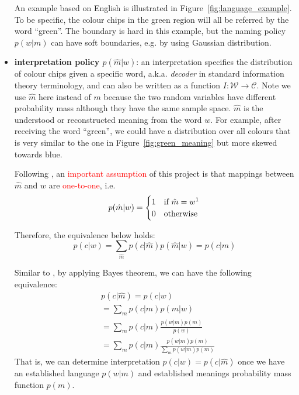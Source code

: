 \documentclass[11pt]{article}
\begin{document}
\begin{itemize}[leftmargin=*]
    An example based on English is illustrated in Figure~\ref{fig:language_example}.
    To be specific, the colour chips in the green region will all be referred by the word ``green''.
    The boundary is hard in this example, but the naming policy $p(w|m)$ can have soft boundaries, e.g. by using Gaussian distribution.
    
    \item \textbf{interpretation policy $p(\hat{m}|w)$\label{par:decoder}}: an interpretation specifies the distribution of colour chips given a specific word, a.k.a. \emph{decoder} in standard information theory terminology, and can also be written as a function $I:\mathcal{W}\rightarrow\mathcal{C}$.
    Note we use $\hat{m}$ here instead of $m$ because the two random variables have different probability mass although they have the same sample space. 
    $\hat{m}$ is the understood or reconstructed meaning from the word $w$.
    For example, after receiving the word ``green'', we could have a distribution over all colours that is very similar to the one in Figure~\ref{fig:green_meaning} but more skewed towards blue.
    
    Following \citet{zaslavsky2018efficient}, an \textcolor{red}{important assumption} of this project is that mappings between $\hat{m}$ and $w$ are \textcolor{red}{one-to-one}, i.e.
    \begin{equation}
        p(\hat{m}|w) =
        \begin{cases}
            1 & \text{if $\hat{m}=w$\footnote{Rigorously speaking, $\hat{m}$ can't equal to $w$, but it is easier to write in this way.}}\\
            0 & \text{otherwise}
        \end{cases} 
        \label{eq:bijective_mhat_w}
    \end{equation}
    
    Therefore, the equivalence below holds:
    \begin{equation}
        p(c|w)  = \sum_{\hat{m}} p(c|\hat{m})p(\hat{m}|w)  = p(c|\hat{m})
        \label{eq:p_mhat_and_m}
    \end{equation}
    
    Similar to \citep{zaslavsky2018efficient}, by applying Bayes theorem, we can have the following equivalence:
    \begin{equation}
        \begin{split}
            & p(c|\hat{m}) = p(c|w) \\
            & = \sum_m p(c|m)p(m|w) \\
            & = \sum_m p(c|m) \frac{p(w|m)p(m)}{p(w)} \\
            & = \sum_m p(c|m) \frac{p(w|m)p(m)}{\sum_m p(w|m)p(m)}
        \end{split}
        \label{eq:bayesian_interpretation}
    \end{equation}
    That is, we can determine interpretation $p(c|w) = p(c|\hat{m})$ once we have an established language $p(w|m)$ and established meanings probability mass function $p(m)$.
    
    
\end{itemize}
\end{document}
